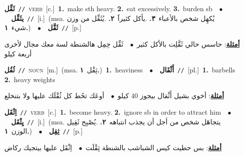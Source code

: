 \documentclass[10pt,a4paper,twoside]{article} %
\begin{document}
\begin{multicols}{2}
{{{{{{{{\setlength\topsep{0pt}\textbf{\foreignlanguage{arabic}{ثَقِّل}}\ {\color{gray}\texttt{//}\color{black}}\ \textsc{verb}\ [c.]\ \textbf{1.}~make sth heavy.  \textbf{2.}~eat excessively.  \textbf{3.}~burden sb\ \ $\bullet$\ \ \setlength\topsep{0pt}\textbf{\foreignlanguage{arabic}{يثَقِّل}}\ {\color{gray}\texttt{//}\color{black}}\ [i.]\ \color{gray}(msa. \foreignlanguage{arabic}{يُكهِل شخص بالأعباء}~\foreignlanguage{arabic}{\textbf{٣.}}  .\foreignlanguage{arabic}{يأكل كثيراََ}~\foreignlanguage{arabic}{\textbf{٢.}}  .\foreignlanguage{arabic}{يُثَقِّل من وزن شيء}~\foreignlanguage{arabic}{\textbf{١.}})\color{black}\ \ $\bullet$\ \ \setlength\topsep{0pt}\textbf{\foreignlanguage{arabic}{ثَقَّل}}\ {\color{gray}\texttt{//}\color{black}}\ [p.]\  \begin{flushright}\color{gray}\foreignlanguage{arabic}{\textbf{\underline{\foreignlanguage{arabic}{أمثلة}}}: حاسس حالي ثَقَّلِت بالأكل كثير\ $\bullet$\ \  ثَقِّل حِمِل هالشنطة لسة معك مجال لأخرى أربعة كيلو}\end{flushright}\color{black}} \vspace{2mm}

{\setlength\topsep{0pt}\textbf{\foreignlanguage{arabic}{ثُقُل}}\ {\color{gray}\texttt{//}\color{black}}\ \textsc{noun}\ [m.]\ \color{gray}(msa. \foreignlanguage{arabic}{ثِقْل}~\foreignlanguage{arabic}{\textbf{١.}})\color{black}\ \textbf{1.}~heaviness\ \ $\bullet$\ \ \setlength\topsep{0pt}\textbf{\foreignlanguage{arabic}{أَثْقَال}}\ {\color{gray}\texttt{//}\color{black}}\ [pl.]\ \textbf{1.}~barbells  \textbf{2.}~heavy weights\  \begin{flushright}\color{gray}\foreignlanguage{arabic}{\textbf{\underline{\foreignlanguage{arabic}{أمثلة}}}: أخوي بشيل أَثْقال بيجوز 40 كيلو\ $\bullet$\ \  أوعَك تحُط كل ثُقْلَك عليها ولا بتنخلع}\end{flushright}\color{black}} \vspace{2mm}

{\setlength\topsep{0pt}\textbf{\foreignlanguage{arabic}{اِثْقَل}}\ {\color{gray}\texttt{//}\color{black}}\ \textsc{verb}\ [c.]\ \textbf{1.}~become heavy.  \textbf{2.}~ignore sb in order to attract him\ \ $\bullet$\ \ \setlength\topsep{0pt}\textbf{\foreignlanguage{arabic}{يِثْقَل}}\ {\color{gray}\texttt{//}\color{black}}\ [i.]\ \color{gray}(msa. \foreignlanguage{arabic}{يتجاهَل شخص من أجل أن يجذب انتباهه}~\foreignlanguage{arabic}{\textbf{٢.}}  .\foreignlanguage{arabic}{يُصْبِح ثَقِيل الوزن}~\foreignlanguage{arabic}{\textbf{١.}})\color{black}\ \ $\bullet$\ \ \setlength\topsep{0pt}\textbf{\foreignlanguage{arabic}{ثِقِل}}\ {\color{gray}\texttt{//}\color{black}}\ [p.]\  \begin{flushright}\color{gray}\foreignlanguage{arabic}{\textbf{\underline{\foreignlanguage{arabic}{أمثلة}}}: بس حطيت كيس الشباشب بالشنطة ثِقْلَت\ $\bullet$\ \  اِثْقَل عليها بيتجيك ركاض}\end{flushright}\color{black}} \vspace{2mm}

}}}}}}}
\end{multicols}
\end{document}
